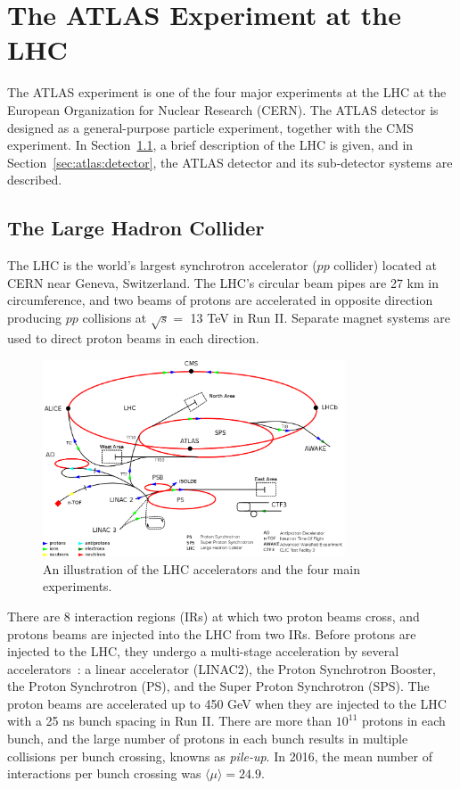 \chapter{The ATLAS Experiment at the LHC}
\label{chap:atlas_experiment}
The ATLAS experiment is one of the four major experiments at the LHC at the European Organization for Nuclear Research (CERN). The ATLAS detector is designed as a general-purpose particle experiment, together with the CMS experiment. In Section~\ref{sec:atlas:lhc}, a brief description of the LHC is given, and in Section~\ref{sec:atlas:detector}, the ATLAS detector and its sub-detector systems are described.

\section{The Large Hadron Collider}
\label{sec:atlas:lhc}

The LHC is the world's largest synchrotron accelerator ($pp$ collider) located at CERN near Geneva, Switzerland. The LHC's circular beam pipes are 27 km in circumference, and two beams of protons are accelerated in opposite direction producing $pp$ collisions at $\sqrt{s} = $ 13 TeV in Run II. Separate magnet systems are used to direct proton beams in each direction.

\begin{figure}[!htb]
    \includegraphics[width=0.8\textwidth]{figures/lhc.png}
    \centering
    \caption{An illustration of the LHC accelerators and the four main experiments.}
    \label{fig:lhc}
\end{figure}

There are 8 interaction regions (IRs) at which two proton beams cross, and protons beams are injected into the LHC from two IRs. Before protons are injected to the LHC, they undergo a multi-stage acceleration by several accelerators~\cite{Bruning:782076}: a linear accelerator (LINAC2), the Proton Synchrotron Booster, the Proton Synchrotron (PS), and the Super Proton Synchrotron (SPS). The proton beams are accelerated up to 450 GeV when they are injected to the LHC with a 25 ns bunch spacing in Run II. There are more than $10^{11}$ protons in each bunch, and the large number of protons in each bunch results in multiple collisions per bunch crossing, knowns as \textit{pile-up}. In 2016, the mean number of interactions per bunch crossing was $\langle\mu\rangle = 24.9$.

